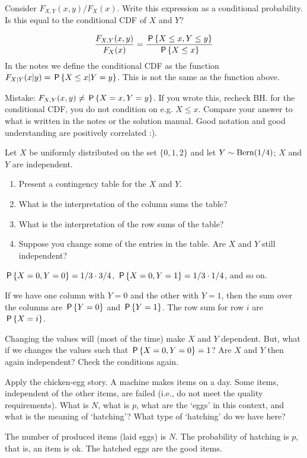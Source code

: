 \documentclass[../../assignments/assignments]{subfiles}
\begin{document}
\begin{exercise}
Consider $F_{X,Y}(x,y)/F_{X}(x)$. Write this expression as a conditional probability. Is this equal to the conditional CDF of $X$ and $Y$?
\begin{solution}

\begin{align}
\frac{F_{X,Y}(x,y)}{F_{X}(x)} = \frac{\P{X\leq x, Y\leq y}}{\P{X\leq x}}
\end{align}
In the notes we define the conditional CDF as the function $F_{X|Y}(x|y) = \P{X\leq x | Y=y}$. This is not the same as the function above.


Mistake: $F_{X,Y}(x,y) \neq \P{X=x, Y=y}$. If you wrote this, recheck BH.
for the conditional CDF, you do not condition on e.g. $X\leq x$.
Compare your answer to what is written in the notes or the solution manual. Good notation and good understanding are positively correlated :).
\end{solution}
\end{exercise}

\begin{exercise}
Let $X$ be uniformly distributed on the set $\{0,1,2\}$ and let $Y \sim \Bern{1/4}$; $X$ and $Y$ are independent.
\begin{enumerate}
\item Present a contingency table for the $X$ and $Y$.
\item What is the interpretation of the column sums the table?
\item What is the interpretation of the row sums of the table?
\item Suppose you change some of the entries in the table. Are $X$ and $Y$ still independent?
\end{enumerate}
\begin{solution}
$\P{X=0, Y=0} = 1/3 \cdot 3/4$,
$\P{X=0, Y=1} = 1/3 \cdot 1/4$, and so on.

If we have one column with $Y=0$ and the other with $Y=1$, then the sum over the columns are $\P{Y=0}$ and $\P{Y=1}$. The row sum for row $i$ are  $\P{X=i}$.

Changing the values will (most of the time) make $X$ and $Y$ dependent. But, what if we changes the values such that  $\P{X=0, Y=0} =1$? Are $X$ and $Y$ then again independent? Check the conditions again.
\end{solution}
\end{exercise}

\begin{exercise}
Apply the chicken-egg story.
A machine makes items on a day.
Some items, independent of the other items, are failed (i.e., do not meet the quality requirements).
What is $N$, what is $p$, what are the `eggs' in this context, and what is the meaning of `hatching'?
What type of `hatching' do we have here?
\begin{solution}
  The number of produced items (laid eggs) is $N$. The probability of hatching is $p$, that is, an item is ok. The hatched eggs are the good items.
\end{solution}
\end{exercise}
\end{document}
